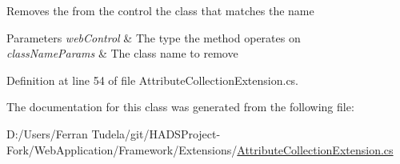 Removes the from the control the class that matches the name 


\begin{DoxyParams}{Parameters}
{\em web\+Control} & The type the method operates on\\
\hline
{\em class\+Name\+Params} & The class name to remove\\
\hline
\end{DoxyParams}


Definition at line 54 of file Attribute\+Collection\+Extension.\+cs.



The documentation for this class was generated from the following file\+:\begin{DoxyCompactItemize}
\item 
D\+:/\+Users/\+Ferran Tudela/git/\+H\+A\+D\+S\+Project-\/\+Fork/\+Web\+Application/\+Framework/\+Extensions/\mbox{\hyperlink{AttributeCollectionExtension_8cs}{Attribute\+Collection\+Extension.\+cs}}\end{DoxyCompactItemize}
